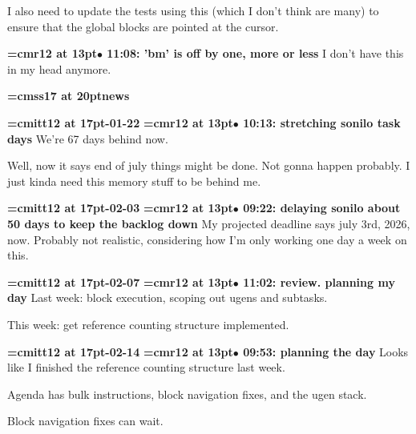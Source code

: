 I also need to update the tests using this (which I don't think are many) to ensure that the global blocks are pointed at the cursor.
\par

{\smallskip\noindent\bf\font\titlefont=cmr12 at 13pt\titlefont $\bullet$ 11:08: 'bm' is off by one, more or less}\smallskip
I don't have this in my head anymore.
\par

{\medskip\noindent\bf\font\titlefont=cmss17 at 20pt\titlefont news}\medskip

{\medskip\noindent\bf\font\titlefont=cmitt12 at 17pt-01-22}\medskip
{\smallskip\noindent\bf\font\titlefont=cmr12 at 13pt\titlefont $\bullet$ 10:13: stretching sonilo task days}\smallskip
We're 67 days behind now.
\par

Well, now it says end of july things might be done. Not gonna happen probably. I just kinda need this memory stuff to be behind me.
\par

{\medskip\noindent\bf\font\titlefont=cmitt12 at 17pt-02-03}\medskip
{\smallskip\noindent\bf\font\titlefont=cmr12 at 13pt\titlefont $\bullet$ 09:22: delaying sonilo about 50 days to keep the backlog down}\smallskip
My projected deadline says july 3rd, 2026, now. Probably not realistic, considering how I'm only working one day a week on this.
\par

{\medskip\noindent\bf\font\titlefont=cmitt12 at 17pt-02-07}\medskip
{\smallskip\noindent\bf\font\titlefont=cmr12 at 13pt\titlefont $\bullet$ 11:02: review. planning my day}\smallskip
Last week: block execution, scoping out ugens and subtasks.
\par

This week: get reference counting structure implemented.
\par

{\medskip\noindent\bf\font\titlefont=cmitt12 at 17pt-02-14}\medskip
{\smallskip\noindent\bf\font\titlefont=cmr12 at 13pt\titlefont $\bullet$ 09:53: planning the day}\smallskip
Looks like I finished the reference counting structure last week.
\par

Agenda has bulk instructions, block navigation fixes, and the ugen stack.
\par

Block navigation fixes can wait.
\par

